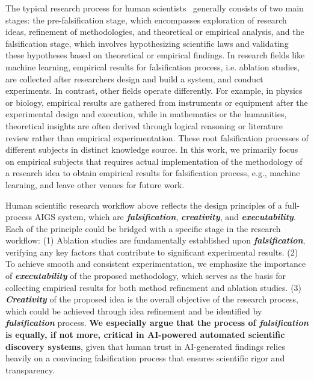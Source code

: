 \documentclass{article} %
\newcommand{\AIGS}{AIGS\xspace}
\begin{document}
The typical research process for human scientists~\citep{Popper1935-POPTLO-7} generally consists of two main stages: the pre-falsification stage, which encompasses exploration of research ideas, refinement of methodologies, and theoretical or empirical analysis, and the falsification stage, which involves hypothesizing scientific laws and validating these hypotheses based on theoretical or empirical findings. 
In research fields like machine learning, empirical results for falsification process, i.e. ablation studies, are collected after researchers design and build a system, and conduct experiments. In contrast, other fields operate differently. For example, in physics or biology, empirical results are gathered from instruments or equipment after the experimental design and execution, while in mathematics or the humanities, theoretical insights are often derived through logical reasoning or literature review rather than empirical experimentation. These root falsification processes of different subjects in distinct knowledge source. In this work, we primarily focus on empirical subjects that requires actual implementation of the methodology of a research idea to obtain empirical results for falsification process, e.g., machine learning, and leave other venues for future work. 

 Human scientific research workflow above reflects the design principles of a full-process \AIGS system, which are \textit{\textbf{falsification}}, \textit{\textbf{creativity}}, and \textit{\textbf{executability}}. 
Each of the principle could be bridged with a specific stage in the research workflow: (1) Ablation studies are fundamentally established upon \textit{\textbf{falsification}}, verifying any key factors that contribute to significant experimental results. (2) To achieve smooth and consistent experimentation, we emphasize the importance of \textit{\textbf{executability}} of the proposed methodology, which serves as the basis for collecting empirical results for both method refinement and ablation studies. (3) \textit{\textbf{Creativity}} of the proposed idea is the overall objective of the research process, which could be achieved through idea refinement and be identified by \textit{\textbf{falsification}} process. 
\textbf{We especially argue that the process of \textit{falsification} is equally, if not more, critical in AI-powered automated scientific discovery systems}, given that human trust in AI-generated findings relies heavily on a convincing falsification process that ensures scientific rigor and transparency.
\end{document}

